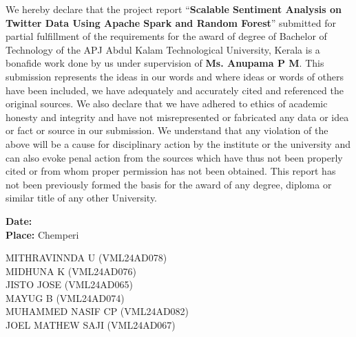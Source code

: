 \documentclass[12pt,a4paper]{article}
\begin{document}
\begin{justify}
\sloppy
{}
\setlength{\parindent}{0pt}

We hereby declare that the project report ``\textbf{Scalable Sentiment Analysis on Twitter Data Using Apache Spark and Random Forest}'' submitted for partial fulfillment of the requirements for the award of degree of Bachelor of Technology of the APJ Abdul Kalam Technological University, Kerala is a bonafide work done by us under supervision of \textbf{Ms. Anupama P M}. This submission represents the ideas in our words and where ideas or words of others have been included, we have adequately and accurately cited and referenced the original sources. We also declare that we have adhered to ethics of academic honesty and integrity and have not misrepresented or fabricated any data or idea or fact or source in our submission. We understand that any violation of the above will be a cause for disciplinary action by the institute or the university and can also evoke penal action from the sources which have thus not been properly cited or from whom proper permission has not been obtained. This report has not been previously formed the basis for the award of any degree, diploma or similar title of any other University.

\end{justify}

\vspace{2cm}

\noindent
\begin{minipage}[t]{0.35\textwidth}
    \textbf{Date:}\\[0.3cm]
    \textbf{Place:} Chemperi
\end{minipage}
\hfill
\begin{minipage}[t]{0.55\textwidth}
    \raggedleft
    MITHRAVINNDA U (VML24AD078) \\[0.3cm]
    MIDHUNA K (VML24AD076) \\[0.3cm]
    JISTO JOSE (VML24AD065) \\[0.3cm]
    MAYUG B (VML24AD074) \\[0.3cm]
    MUHAMMED NASIF CP (VML24AD082) \\[0.3cm]
    JOEL MATHEW SAJI (VML24AD067)
\end{minipage}

\end{document}
